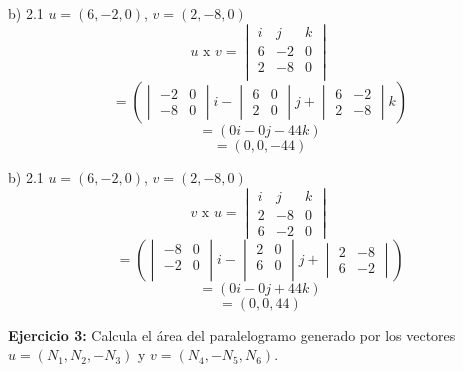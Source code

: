\documentclass{article}
\begin{document}
\hspace*{-2cm}\begin{minipage}[c]{6cm}
    b) 2.1 $u =(6, -2, 0)$, $v = (2, -8, 0)$
    $$u \text{ x } v = \begin{vmatrix}
        i & j & k\\
        6 & -2 & 0\\
        2 & -8 & 0 \\
    \end{vmatrix}$$
    $$= \left(\begin{vmatrix}
        -2 & 0 \\
        -8 & 0 
    \end{vmatrix}i - \begin{vmatrix}
        6 & 0 \\
        2 & 0 
    \end{vmatrix}j+ \begin{vmatrix}
        6 & -2 \\
        2 & -8
    \end{vmatrix}k\right)$$
    $$=(0i -0j-44 k)$$
    $$= (0, 0, -44)$$
\end{minipage}\hspace*{3cm}\begin{minipage}[c]{6cm}
    b) 2.1 $u =(6, -2, 0)$, $v = (2, -8, 0)$
    $$v \text{ x } u = \begin{vmatrix}
        i & j & k \\
        2 & -8 & 0 \\
        6 & -2 & 0 
    \end{vmatrix} $$
    $$= \left(\begin{vmatrix}
        -8 & 0 \\
        -2 & 0\\
    \end{vmatrix}i - \begin{vmatrix}
        2 & 0 \\
        6 & 0 \\
    \end{vmatrix}j +\begin{vmatrix}
        2 & -8 \\
        6 & -2
    \end{vmatrix}\right)$$
    $$=(0i-0j+44k)$$
    $$=(0, 0, 44)$$
\end{minipage}
\vspace{10pt}

\textbf{Ejercicio 3:} Calcula el área del paralelogramo generado por los vectores $u =(N_1, N_2, -N_3)$ y $v = (N_4,-N_5,N_6)$.
\vspace{10pt}
\end{document}
